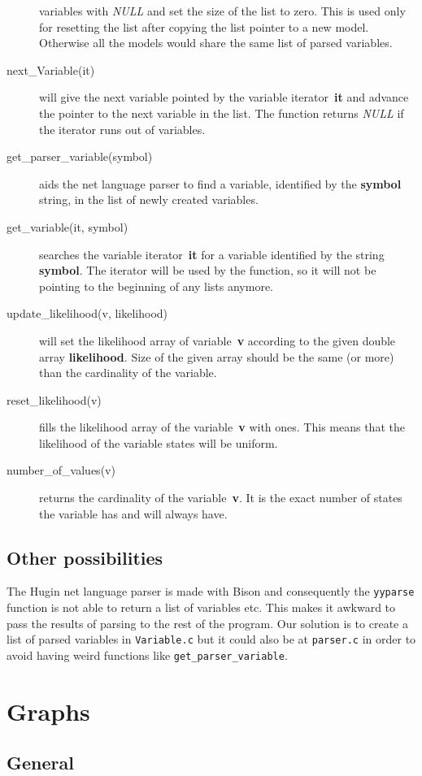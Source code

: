 \documentclass[12pt,a4paper]{report}
\begin{document}
\begin{description}
variables with {\it NULL} and set the size of the list to zero. This
is used only for resetting the list after copying the list pointer
to a new model. Otherwise all the models would share the same list of
parsed variables.
\item[next\_Variable(it)] will give the next variable pointed by the
variable iterator~\textbf{it} and advance the pointer to the next
variable in the list. The function returns {\it NULL} if the iterator
runs out of variables.
\item[get\_parser\_variable(symbol)] aids the net language parser 
to find a variable, identified by the \textbf{symbol} string, in the 
list of newly created variables.
\item[get\_variable(it, symbol)] searches the
variable iterator~\textbf{it} for a variable identified by the string
\textbf{symbol}. The iterator will be used by the function, so it will
not be pointing to the beginning of any lists anymore.
\item[update\_likelihood(v, likelihood)] will set the likelihood array
of variable~\textbf{v} according to the given double array 
\textbf{likelihood}. Size of the given array should be the same 
(or more) than the cardinality of the variable.
\item[reset\_likelihood(v)] fills the likelihood array of the
variable~\textbf{v} with ones. This means that the likelihood of the
variable states will be uniform.
\item[number\_of\_values(v)] returns the cardinality of the
variable~\textbf{v}. It is the exact number of states the variable has
and will always have.
\end{description}


\subsection{Other possibilities}
The Hugin net language parser is made with Bison and consequently the 
\verb+yyparse+ function is not able to return a list of variables etc. 
This makes it awkward to pass the results of parsing to the rest of the
program. Our solution is to create a list of parsed variables in
\verb+Variable.c+ but it could also be at \verb+parser.c+ in order to
avoid having weird functions like \verb+get_parser_variable+.


\newpage
\section{Graphs}
\subsection{General}
\end{document}
